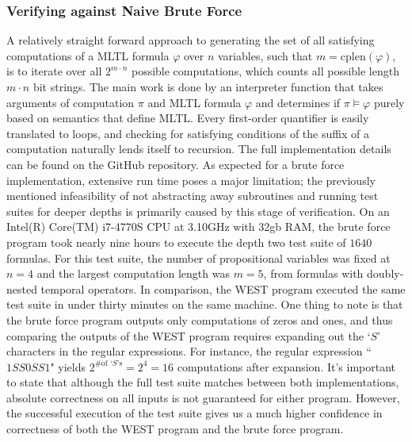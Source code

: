 \documentclass[runningheads]{llncs}
\renewcommand{\phi}{\varphi}
\begin{document}
\subsubsection{Verifying against Naive Brute Force}
 A relatively straight forward approach to generating the set of all satisfying computations of a MLTL formula $\phi$ over $n$ variables, such that $m = \text{cplen}(\phi)$, is to iterate over all $2^{m \cdot n}$ possible computations, which counts all possible length $m \cdot n$ bit strings. 
The main work is done by an interpreter function that takes arguments of computation $\pi$ and MLTL formula $\phi$ and determines if $\pi \vDash \phi$ purely based on semantics that define MLTL.
Every first-order quantifier is easily translated to loops, and checking for satisfying conditions of the suffix of a computation naturally lends itself to recursion.
The full implementation details can be found on the %
{GitHub} repository. 
As expected for a brute force implementation, extensive run time poses a major limitation; the previously mentioned infeasibility of not abstracting away subroutines and running test suites for deeper depths is primarily caused by this stage of verification. 
On an Intel(R) Core(TM) i7-4770S CPU at 3.10GHz with 32gb RAM, the brute force program took nearly nine hours to execute the depth two test suite of $1640$ formulas. 
For this test suite, the number of propositional variables was fixed at $n = 4$ and the largest computation length was $m = 5$, from formulas with doubly-nested temporal operators. 
In comparison, the WEST program executed the same test suite in under thirty minutes on the same machine. One thing to note is that the brute force program outputs only computations of zeros and ones, and thus comparing the outputs of the WEST program requires expanding out the `$S$' characters in the regular expressions. For instance, the regular expression ``$1SS0SS1$" yields $2^{\text{\# of `$S$'s}} = 2^4 = 16$ computations after expansion.
It's important to state that although the full test suite matches between both implementations, absolute correctness on all inputs is not guaranteed for either program. However, the successful execution of the test suite gives us a much higher confidence in correctness of both the WEST program and the brute force program. 
\end{document}
